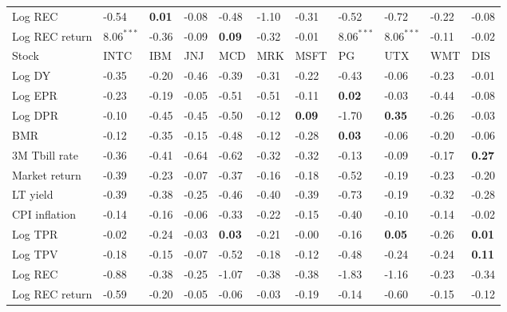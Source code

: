\begin{table}[h!]
{\begin{center}
\begin{tabularx}{1\textwidth}{@{}X@{\hspace{0.2cm}}l@{\hspace{0.2cm}}l@{\hspace{0.2cm}}l@{\hspace{0.2cm}}l@{\hspace{0.2cm}}l@{\hspace{0.2cm}}l@{\hspace{0.2cm}}l@{\hspace{0.2cm}}l@{\hspace{0.2cm}}l@{\hspace{0.2cm}}l@{}}
 Log REC  & -0.54	 & \textbf{0.01}	 & -0.08	 & -0.48	 & -1.10	 & -0.31	 & -0.52	 & -0.72	 & -0.22	 & -0.08	\\
 Log REC return  & $\mathbf{8.06^{***}}$	 & -0.36	 & -0.09	 & \textbf{0.09}	 & -0.32	 & -0.01	 & $\mathbf{8.06^{***}}$	 & $\mathbf{8.06^{***}}$	 & -0.11	 & -0.02	\\
\midrule
\midrule
 Stock  & INTC	 & IBM	 & JNJ	 & MCD	 & MRK	 & MSFT	 & PG	 & UTX	 & WMT	 & DIS	\\
\midrule
 Log DY  & -0.35	 & -0.20	 & -0.46	 & -0.39	 & -0.31	 & -0.22	 & -0.43	 & -0.06	 & -0.23	 & -0.01	\\
 Log EPR  & -0.23	 & -0.19	 & -0.05	 & -0.51	 & -0.51	 & -0.11	 & \textbf{0.02}	 & -0.03	 & -0.44	 & -0.08	\\
 Log DPR  & -0.10	 & -0.45	 & -0.45	 & -0.50	 & -0.12	 & \textbf{0.09}	 & -1.70	 & \textbf{0.35}	 & -0.26	 & -0.03	\\
 BMR  & -0.12	 & -0.35	 & -0.15	 & -0.48	 & -0.12	 & -0.28	 & \textbf{0.03}	 & -0.06	 & -0.20	 & -0.06	\\
\midrule
 3M Tbill rate  & -0.36	 & -0.41	 & -0.64	 & -0.62	 & -0.32	 & -0.32	 & -0.13	 & -0.09	 & -0.17	 & \textbf{0.27}	\\
 Market return  & -0.39	 & -0.23	 & -0.07	 & -0.37	 & -0.16	 & -0.18	 & -0.52	 & -0.19	 & -0.23	 & -0.20	\\
 LT yield  & -0.39	 & -0.38	 & -0.25	 & -0.46	 & -0.40	 & -0.39	 & -0.73	 & -0.19	 & -0.32	 & -0.28	\\
 CPI inflation  & -0.14	 & -0.16	 & -0.06	 & -0.33	 & -0.22	 & -0.15	 & -0.40	 & -0.10	 & -0.14	 & -0.02	\\
\midrule
 Log TPR  & -0.02	 & -0.24	 & -0.03	 & \textbf{0.03}	 & -0.21	 & -0.00	 & -0.16	 & \textbf{0.05}	 & -0.26	 & \textbf{0.01}	\\
 Log TPV  & -0.18	 & -0.15	 & -0.07	 & -0.52	 & -0.18	 & -0.12	 & -0.48	 & -0.24	 & -0.24	 & \textbf{0.11}	\\
 Log REC  & -0.88	 & -0.38	 & -0.25	 & -1.07	 & -0.38	 & -0.38	 & -1.83	 & -1.16	 & -0.23	 & -0.34	\\
 Log REC return  & -0.59	 & -0.20	 & -0.05	 & -0.06	 & -0.03	 & -0.19	 & -0.14	 & -0.60	 & -0.15	 & -0.12	\\
\bottomrule\bottomrule
\end{tabularx}
\vspace{0.2cm}

\end{center}}
\end{table}
